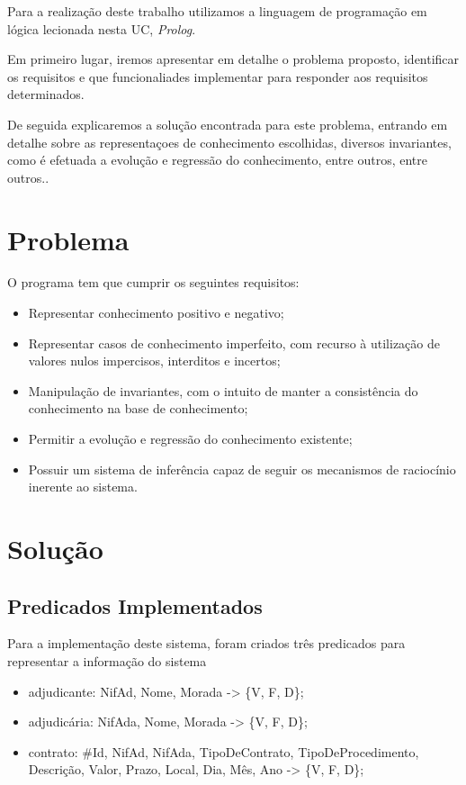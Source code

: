 \documentclass[a4paper]{report}
\begin{document}
Para a realização deste trabalho utilizamos a linguagem de programação em lógica
lecionada nesta UC, \textit{Prolog}.

Em primeiro lugar, iremos apresentar em detalhe o problema proposto, identificar
os requisitos e que funcionaliades implementar para responder aos requisitos
determinados.

De seguida explicaremos a solução encontrada para este problema, entrando em
detalhe sobre as representaçoes de conhecimento escolhidas, diversos
invariantes, como é efetuada a evolução e regressão do conhecimento, entre
outros, entre outros..

\chapter{Problema}

O programa tem que cumprir os seguintes requisitos:
\begin{itemize}
        \item Representar conhecimento positivo e negativo;
        \item Representar casos de conhecimento imperfeito, com recurso à
            utilização de valores nulos impercisos, interditos e incertos;
        \item Manipulação de invariantes, com o intuito de manter a consistência
            do conhecimento na base de conhecimento;
        \item Permitir a evolução e regressão do conhecimento existente;
        \item Possuir um sistema de inferência capaz de seguir os mecanismos de
            raciocínio inerente ao sistema.
\end{itemize}

\chapter{Solução}

\section{Predicados Implementados}

Para a implementação deste sistema, foram criados três predicados para
representar a informação do sistema
\begin{itemize}
    \item adjudicante: NifAd, Nome, Morada -> \{V, F, D\};
    \item adjudicária: NifAda, Nome, Morada -> \{V, F, D\};
    \item contrato: \#Id, NifAd, NifAda, TipoDeContrato,
        TipoDeProcedimento, Descrição, Valor, Prazo, Local, Dia, Mês, Ano ->
        \{V, F, D\};
\end{itemize}
\end{document}
